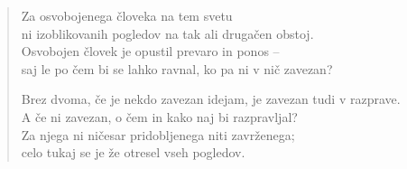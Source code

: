 \begin{verse}
Za osvobojenega človeka na tem svetu\\
ni izoblikovanih pogledov na tak ali drugačen obstoj.\\
Osvobojen človek je opustil prevaro in ponos --\\
saj le po čem bi se lahko ravnal, ko pa ni v nič zavezan?

Brez dvoma, če je nekdo zavezan idejam, je zavezan tudi v razprave.\\
A če ni zavezan, o čem in kako naj bi razpravljal?\\
Za njega ni ničesar pridobljenega niti zavrženega;\\
celo tukaj se je že otresel vseh pogledov.

\end{verse}


\clearpage
\begin{verse}


\end{verse}


\clearpage
\begin{verse}


\end{verse}

